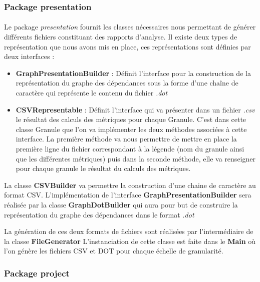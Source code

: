 \documentclass{scrartcl}
\begin{document}
\subsubsection{Package presentation}
    \paragraph{}Le package \emph{presentation} fournit les classes nécessaires nous permettant de générer différents fichiers constituant des rapports d'analyse. Il existe deux types de représentation que nous avons mis en place, ces représentations sont définies par deux interfaces :
    \begin{itemize}
        \item \textbf{GraphPresentationBuilder} : Définit l'interface pour la construction de la représentation du graphe des dépendances sous la forme d'une chaîne de caractère qui représente le contenu du fichier \emph{.dot} %
        
        \item \textbf{CSVRepresentable} : Définit l'interface qui va présenter dans un fichier \emph{.csv} le résultat des calculs des métriques pour chaque Granule. C'est dans cette classe Granule que l'on va implémenter les deux méthodes associées à cette interface. La première méthode va nous permettre de mettre en place la première ligne du fichier correspondant à la légende (nom du granule ainsi que les différentes métriques) puis dans la seconde méthode, elle va renseigner pour chaque granule le résultat du calculs des métriques. 
    \end{itemize}
    
    La classe \textbf{CSVBuilder} va permettre la construction d'une chaine de caractère au format CSV.
    L'implémentation de l'interface \textbf{GraphPresentationBuilder} sera réalisée par la classe \textbf{GraphDotBuilder} qui aura pour but de construire la représentation du graphe des dépendances dans le format \emph{.dot}
    
   La génération de ces deux formats de fichiers sont réalisées par l'intermédiaire de la classe \textbf{FileGenerator} 
   L'instanciation de cette classe est faite dans le \textbf{Main} où l'on génère les fichiers CSV et DOT pour chaque échelle de granularité.

    
\subsubsection{Package project}
\end{document}
